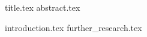 \documentclass[11pt]{llncs}
\begin{document}
{title.tex}
\thispagestyle{plain}
{abstract.tex}

{introduction.tex}
{further_research.tex}



\end{document}
